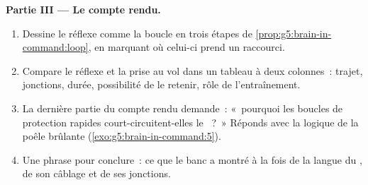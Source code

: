 \begin{problem}
\medskip\noindent\textbf{Partie III --- Le compte rendu.}
\begin{enumerate}[resume]
  \item Dessine le réflexe comme la boucle en trois étapes de
        \cref{prop:g5:brain-in-command:loop}, en marquant où
        celui-ci prend un raccourci.
  \item Compare le réflexe et la prise au vol dans un tableau à deux
        colonnes~: trajet, jonctions, durée, possibilité de le
        retenir, rôle de l'entraînement.
  \item La dernière partie du compte rendu demande~: «~pourquoi les
        boucles de protection rapides court-circuitent-elles le
        ~?~» Réponds avec la logique de la poêle brûlante
        (\cref{exo:g5:brain-in-command:5}).
  \item Une phrase pour conclure~: ce que le banc a montré à la fois
        de la langue du , de son câblage et de ses
        jonctions.
\end{enumerate}
\end{problem}
